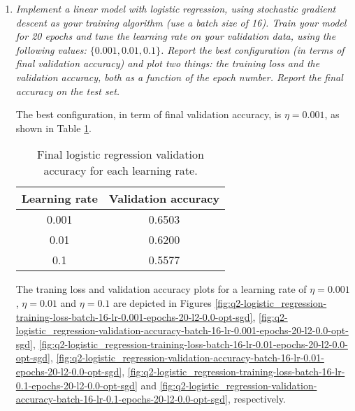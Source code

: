 \documentclass[12pt]{article}
\begin{document}
\begin{enumerate}[leftmargin=\labelsep]
    \item \textit{Implement a linear model with logistic regression, using stochastic gradient descent as your training algorithm (use a batch size of 16). Train your model for 20 epochs and tune the learning rate on your validation data, using the following values: $\{0.001, 0.01, 0.1\}$.  Report the best configuration (in terms of final validation accuracy) and plot two things: the training loss and the validation accuracy, both as a function of the epoch number. Report the final accuracy on the test set.}

          \vspace{12pt}

          The best configuration, in term of final validation accuracy, is $\eta = 0.001$, as shown in Table \ref{tab:logistic_regression-20}.

          \begin{table}[H]
              \centering
              \begin{tabular}{|c|c|}
                  \hline
                  Learning rate & Validation accuracy \\ \hline
                  0.001         & 0.6503              \\ \hline
                  0.01          & 0.6200              \\ \hline
                  0.1           & 0.5577              \\ \hline
              \end{tabular}
              \caption{Final logistic regression validation accuracy for each learning rate.}
              \label{tab:logistic_regression-20}
          \end{table}

          The traning loss and validation accuracy plots for a learning rate of $\eta = 0.001$, $\eta = 0.01$ and $\eta = 0.1$ are depicted in Figures \ref{fig:q2-logistic_regression-training-loss-batch-16-lr-0.001-epochs-20-l2-0.0-opt-sgd}, \ref{fig:q2-logistic_regression-validation-accuracy-batch-16-lr-0.001-epochs-20-l2-0.0-opt-sgd}, \ref{fig:q2-logistic_regression-training-loss-batch-16-lr-0.01-epochs-20-l2-0.0-opt-sgd}, \ref{fig:q2-logistic_regression-validation-accuracy-batch-16-lr-0.01-epochs-20-l2-0.0-opt-sgd}, \ref{fig:q2-logistic_regression-training-loss-batch-16-lr-0.1-epochs-20-l2-0.0-opt-sgd} and \ref{fig:q2-logistic_regression-validation-accuracy-batch-16-lr-0.1-epochs-20-l2-0.0-opt-sgd}, respectively.


\end{enumerate}
\end{document}

